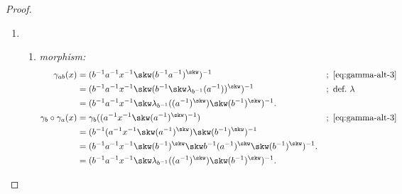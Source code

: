\begin{proof}
\begin{enumerate}[\rm a)]
    \item 
        \begin{enumerate}[-]
            \item \textit{morphism:}
                \begin{align*}
                    \gamma_{ab}(x)
                        &= (b^{-1}a^{-1}x^{-1}\skw(b^{-1}a^{-1})^\skw)^{-1}
                            &&;\ \eqref{eq:gamma-alt-3}\\
                        &= (b^{-1}a^{-1}x^{-1}\skw(b^{-1}
                            \skw\lambda_{b^{-1}}(a^{-1}))^\skw)^{-1}
                            &&;\ \text{def.~}\lambda\\
                        &= (b^{-1}a^{-1}x^{-1}\skw\lambda_{b^{-1}}((a^{-1})^\skw)
                            \skw(b^{-1})^\skw)^{-1}.\\
                    \gamma_b\circ\gamma_a(x)
                        &= \gamma_b((a^{-1}x^{-1}
                            \skw(a^{-1})^\skw)^{-1})
                            &&;\ \eqref{eq:gamma-alt-3}\\
                        &= (b^{-1}(a^{-1}x^{-1}\skw(a^{-1})^\skw)
                            \skw(b^{-1})^\skw)^{-1}\\
                        &= (b^{-1}a^{-1}x^{-1}\skw(b^{-1})^\skw
                            \skw b^{-1}(a^{-1})^\skw
                            \skw(b^{-1})^\skw)^{-1}.\\
                        &= (b^{-1}a^{-1}x^{-1}\skw\lambda_{b^{-1}}((a^{-1})^\skw)
                            \skw(b^{-1})^\skw)^{-1}.
                \end{align*}
            
                

\end{enumerate}
\end{enumerate}
\end{proof}
